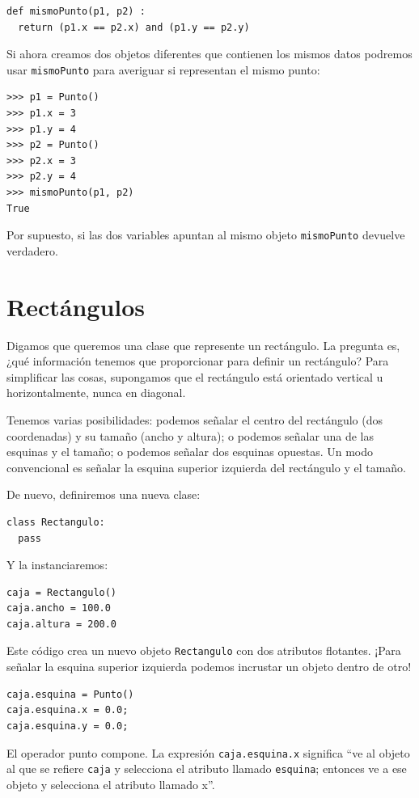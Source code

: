 \begin{verbatim}
def mismoPunto(p1, p2) :
  return (p1.x == p2.x) and (p1.y == p2.y)
\end{verbatim}
 Si ahora creamos dos objetos diferentes que contienen los mismos
datos podremos usar \texttt{mismoPunto} para averiguar si representan
el mismo punto:

\begin{verbatim}
>>> p1 = Punto()
>>> p1.x = 3
>>> p1.y = 4
>>> p2 = Punto()
>>> p2.x = 3
>>> p2.y = 4
>>> mismoPunto(p1, p2)
True
\end{verbatim}
 Por supuesto, si las dos variables apuntan al mismo objeto \texttt{mismoPunto}
devuelve verdadero.

\section{Rectángulos}

\label{embedded} 

Digamos que queremos una clase que represente un rectángulo. La pregunta
es, ¿qué información tenemos que proporcionar para definir un rectángulo?
Para simplificar las cosas, supongamos que el rectángulo está orientado
vertical u horizontalmente, nunca en diagonal.

Tenemos varias posibilidades: podemos señalar el centro del rectángulo
(dos coordenadas) y su tamaño (ancho y altura); o podemos señalar
una de las esquinas y el tamaño; o podemos señalar dos esquinas opuestas.
Un modo convencional es señalar la esquina superior izquierda del
rectángulo y el tamaño.

De nuevo, definiremos una nueva clase:
\begin{verbatim}
class Rectangulo:	
  pass
\end{verbatim}

Y la instanciaremos:
\begin{verbatim}
caja = Rectangulo()
caja.ancho = 100.0
caja.altura = 200.0
\end{verbatim}

Este código crea un nuevo objeto \texttt{Rectangulo} con dos atributos
flotantes. ¡Para señalar la esquina superior izquierda podemos incrustar
un objeto dentro de otro!
\begin{verbatim}
caja.esquina = Punto()
caja.esquina.x = 0.0;
caja.esquina.y = 0.0;
\end{verbatim}

El operador punto compone. La expresión \texttt{caja.esquina.x} significa
``ve al objeto al que se refiere \texttt{caja} y selecciona el atributo
llamado \texttt{esquina}; entonces ve a ese objeto y selecciona el
atributo llamado x''.

